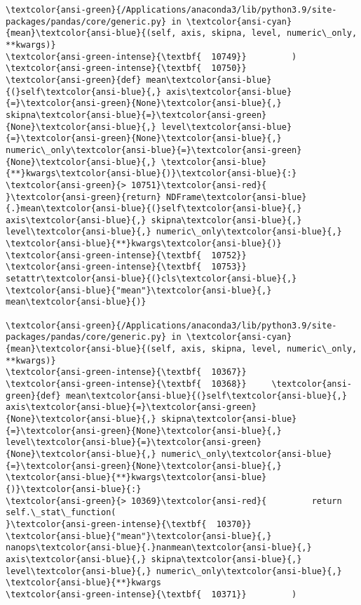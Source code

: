 \documentclass[11pt]{article}
\begin{document}
\begin{Verbatim}[commandchars=\\\{\}, frame=single, framerule=2mm, rulecolor=\color{outerrorbackground}]
\textcolor{ansi-green}{/Applications/anaconda3/lib/python3.9/site-packages/pandas/core/generic.py} in \textcolor{ansi-cyan}{mean}\textcolor{ansi-blue}{(self, axis, skipna, level, numeric\_only, **kwargs)}
\textcolor{ansi-green-intense}{\textbf{  10749}}         )
\textcolor{ansi-green-intense}{\textbf{  10750}}         \textcolor{ansi-green}{def} mean\textcolor{ansi-blue}{(}self\textcolor{ansi-blue}{,} axis\textcolor{ansi-blue}{=}\textcolor{ansi-green}{None}\textcolor{ansi-blue}{,} skipna\textcolor{ansi-blue}{=}\textcolor{ansi-green}{None}\textcolor{ansi-blue}{,} level\textcolor{ansi-blue}{=}\textcolor{ansi-green}{None}\textcolor{ansi-blue}{,} numeric\_only\textcolor{ansi-blue}{=}\textcolor{ansi-green}{None}\textcolor{ansi-blue}{,} \textcolor{ansi-blue}{**}kwargs\textcolor{ansi-blue}{)}\textcolor{ansi-blue}{:}
\textcolor{ansi-green}{> 10751}\textcolor{ansi-red}{             }\textcolor{ansi-green}{return} NDFrame\textcolor{ansi-blue}{.}mean\textcolor{ansi-blue}{(}self\textcolor{ansi-blue}{,} axis\textcolor{ansi-blue}{,} skipna\textcolor{ansi-blue}{,} level\textcolor{ansi-blue}{,} numeric\_only\textcolor{ansi-blue}{,} \textcolor{ansi-blue}{**}kwargs\textcolor{ansi-blue}{)}
\textcolor{ansi-green-intense}{\textbf{  10752}} 
\textcolor{ansi-green-intense}{\textbf{  10753}}         setattr\textcolor{ansi-blue}{(}cls\textcolor{ansi-blue}{,} \textcolor{ansi-blue}{"mean"}\textcolor{ansi-blue}{,} mean\textcolor{ansi-blue}{)}

\textcolor{ansi-green}{/Applications/anaconda3/lib/python3.9/site-packages/pandas/core/generic.py} in \textcolor{ansi-cyan}{mean}\textcolor{ansi-blue}{(self, axis, skipna, level, numeric\_only, **kwargs)}
\textcolor{ansi-green-intense}{\textbf{  10367}} 
\textcolor{ansi-green-intense}{\textbf{  10368}}     \textcolor{ansi-green}{def} mean\textcolor{ansi-blue}{(}self\textcolor{ansi-blue}{,} axis\textcolor{ansi-blue}{=}\textcolor{ansi-green}{None}\textcolor{ansi-blue}{,} skipna\textcolor{ansi-blue}{=}\textcolor{ansi-green}{None}\textcolor{ansi-blue}{,} level\textcolor{ansi-blue}{=}\textcolor{ansi-green}{None}\textcolor{ansi-blue}{,} numeric\_only\textcolor{ansi-blue}{=}\textcolor{ansi-green}{None}\textcolor{ansi-blue}{,} \textcolor{ansi-blue}{**}kwargs\textcolor{ansi-blue}{)}\textcolor{ansi-blue}{:}
\textcolor{ansi-green}{> 10369}\textcolor{ansi-red}{         return self.\_stat\_function(
}\textcolor{ansi-green-intense}{\textbf{  10370}}             \textcolor{ansi-blue}{"mean"}\textcolor{ansi-blue}{,} nanops\textcolor{ansi-blue}{.}nanmean\textcolor{ansi-blue}{,} axis\textcolor{ansi-blue}{,} skipna\textcolor{ansi-blue}{,} level\textcolor{ansi-blue}{,} numeric\_only\textcolor{ansi-blue}{,} \textcolor{ansi-blue}{**}kwargs
\textcolor{ansi-green-intense}{\textbf{  10371}}         )


\end{Verbatim}
\end{document}
